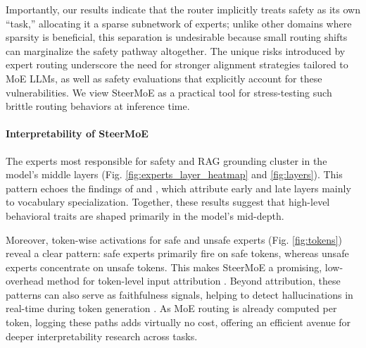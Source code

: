 \documentclass{article} %
\begin{document}
Importantly, our results indicate that the router implicitly treats safety as its own “task,” allocating it a sparse subnetwork of experts; unlike other domains where sparsity is beneficial, this separation is undesirable because small routing shifts can marginalize the safety pathway altogether.
The unique risks introduced by expert routing underscore the need for stronger alignment strategies tailored to MoE LLMs, as well as safety evaluations that explicitly account for these vulnerabilities. We view SteerMoE as a practical tool for stress-testing such brittle routing behaviors at inference time.




\paragraph{Interpretability of SteerMoE}
The experts most responsible for safety and RAG grounding cluster in the model’s middle layers (Fig. \ref{fig:experts_layer_heatmap} and \ref{fig:layers}). This pattern echoes the findings of \citet{muennighoff2025olmoeopenmixtureofexpertslanguage} and \citet{jiang2024mixtralexperts}, which attribute early and late layers mainly to vocabulary specialization. Together, these results suggest that high-level behavioral traits are shaped primarily in the model’s mid-depth.

Moreover, token-wise activations for safe and unsafe experts (Fig. \ref{fig:tokens}) reveal a clear pattern: safe experts primarily fire on safe tokens, whereas unsafe experts concentrate on unsafe tokens. This makes SteerMoE a promising, low-overhead method for token-level input attribution \citep{atanasova-etal-2020-diagnostic, sarti-etal-2023-inseq, modarressi-etal-2022-globenc,modarressi-etal-2023-decompx}. Beyond attribution, these patterns can also serve as faithfulness signals, helping to detect hallucinations in real-time during token generation \citep{obeso2025realtimedetectionhallucinatedentities}. As MoE routing is already computed per token, logging these paths adds virtually no cost, offering an efficient avenue for deeper interpretability research across tasks.
\end{document}
